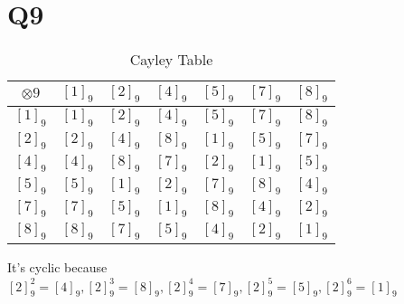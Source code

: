 \documentclass[12pt]{article}
\begin{document}
\section{Q9}
\begin{table}[H]
\centering

\begin{tabular}{|c|c|c|c|c|c|c|}
\hline
$\otimes9$&$[1]_9$  &$[2]_9$  &$[4]_9$  &$[5]_9$  &$[7]_9$  &$[8]_9$  \\ \hline
$[1]_9$ &$[1]_9$  &$[2]_9$  &$[4]_9$  &$[5]_9$  &$[7]_9$  &$[8]_9$  \\ \hline
$[2]_9$ &$[2]_9$  &$[4]_9$  &$[8]_9$  &$[1]_9$  &$[5]_9$  &$[7]_9$  \\ \hline
$[4]_9$ &$[4]_9$  &$[8]_9$  &$[7]_9$  &$[2]_9$  &$[1]_9$  &$[5]_9$  \\ \hline
$[5]_9$ &$[5]_9$  &$[1]_9$  &$[2]_9$  &$[7]_9$  &$[8]_9$  &$[4]_9$  \\ \hline
$[7]_9$ &$[7]_9$  &$[5]_9$  &$[1]_9$  &$[8]_9$  &$[4]_9$  &$[2]_9$  \\ \hline
$[8]_9$ &$[8]_9$  &$[7]_9$  &$[5]_9$  &$[4]_9$  &$[2]_9$  &$[1]_9$  \\ \hline
\end{tabular}
\caption{Cayley Table}
\end{table}
It's cyclic because $[2]_9^2=[4]_9,[2]_9^3=[8]_9,[2]_9^4=[7]_9,[2]_9^5=[5]_9,[2]_9^6=[1]_9$ 
\end{document}
